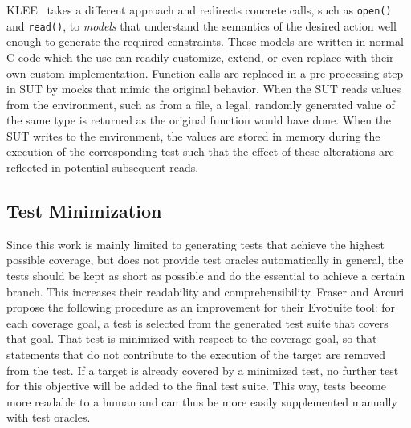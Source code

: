\documentclass{article}
\begin{document}
KLEE~\cite{cadar2008klee} takes a different approach and redirects concrete calls, such as \lstinline{open()} and \lstinline{read()}, to \textit{models} that understand the semantics of the desired action well enough to generate the required constraints. These models are written in normal C code which the use can readily customize, extend, or even replace with their own custom implementation. Function calls are replaced in a pre-processing step in \ac{SUT} by mocks that mimic the original behavior. When the \ac{SUT} reads values from the environment, such as from a file, a legal, randomly generated value of the same type is returned as the original function would have done. When the \ac{SUT} writes to the environment, the values are stored in memory during the execution of the corresponding test such that the effect of these alterations are reflected in potential subsequent reads. 

\subsection{Test Minimization}

Since this work is mainly limited to generating tests that achieve the highest possible coverage, but does not provide test oracles automatically in general, the tests should be kept as short as possible and do the essential to achieve a certain branch. This increases their readability and comprehensibility. Fraser and Arcuri~\cite{Fraser2013a} propose the following procedure as an improvement for their EvoSuite tool: for each coverage goal, a test is selected from the generated test suite that covers that goal. That test is minimized with respect to the coverage goal, so that statements that do not contribute to the execution of the target are removed from the test. If a target is already covered by a minimized test, no further test for this objective will be added to the final test suite. This way, tests become more readable to a human and can thus be more easily supplemented manually with test oracles. 
\end{document}
